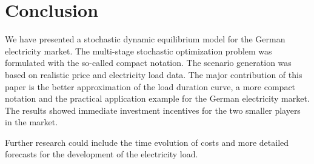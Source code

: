 \clearpage
\section{Conclusion}
\label{sec:conclusion}

We have presented a stochastic dynamic equilibrium model for the German electricity market. The multi-stage stochastic optimization problem was formulated with the so-called compact notation. The scenario generation was based on realistic price and electricity load data. The major contribution of this paper is the better approximation of the load duration curve, a more compact notation and the practical application example for the German electricity market. The results showed immediate investment incentives for the two smaller players in the market.

Further research could include the time evolution of costs and more detailed forecasts for the development of the electricity load.

